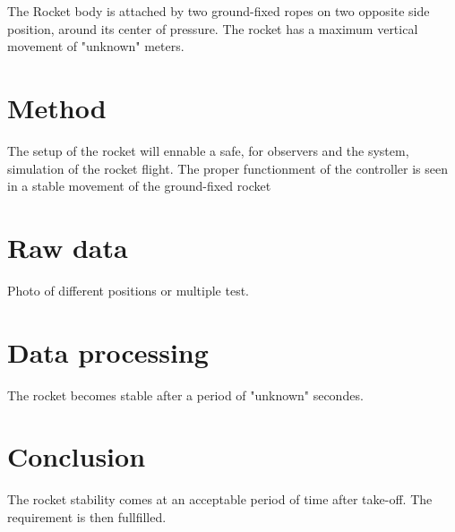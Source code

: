 The Rocket body is attached by two ground-fixed ropes on two opposite side position, around its center of pressure. The rocket has a maximum vertical movement of "unknown" meters.




	\section*{Method}
 The setup of the rocket will ennable a safe, for observers and the system, simulation of the rocket flight. The proper functionment of the controller is seen in a stable movement of the ground-fixed rocket



	\section*{Raw data}

Photo of different positions or multiple test.




	\section*{Data processing}	
The rocket becomes stable after a period of "unknown" secondes.
 
 
 

	\section*{Conclusion}

The rocket stability comes at an acceptable period of time after take-off. The requirement is then fullfilled.


